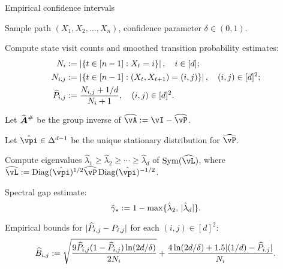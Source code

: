 \begin{algorithm}[t]
\caption{Empirical confidence intervals}
\label{alg:empest}
\begin{algorithmic}[1]
  \renewcommand\algorithmicrequire{\textbf{Input}:}
  \REQUIRE
    Sample path $(X_1,X_2,\dots,X_n)$,
    confidence parameter $\delta \in (0,1)$.

  \STATE Compute state visit counts and smoothed transition
  probability estimates:
  \begin{equation}
    \begin{aligned}
      N_i & :=
      \left|
        \left\{
          t \in [n-1] : X_t = i
        \right\}
      \right|
      , \quad i \in [d] ; \\
      N_{i,j} & :=
      \left|
        \left\{
          t \in [n-1] : (X_t,X_{t+1}) = (i,j)
        \right\}
      \right|
      , \quad (i,j) \in [d]^2 ; \\
      \widehat{P}_{i,j}
      & :=
      \frac{N_{i,j} + 1/d}{N_i + 1}
      , \quad (i,j) \in [d]^2 .
    \end{aligned}
    \notag
  \end{equation}
  \label{step:P}

  \STATE Let $\giAh$ be the group inverse of $\wh\vA := \vI -
  \wh\vP$.
  \label{step:gi}

  \STATE Let $\hat\vpi \in \Delta^{d-1}$ be the unique stationary
  distribution for $\wh\vP$.
  \label{step:pi}

  \STATE Compute eigenvalues $\hat\lambda_1 {\geq} \hat\lambda_2
  {\geq} \dotsb {\geq} \hat\lambda_d$ of $\Sym(\wh\vL)$, where $\wh\vL
  := \Diag(\hat\vpi)^{1/2} \wh\vP \Diag(\hat\vpi)^{-1/2}$.
  \label{step:eig}

  \STATE Spectral gap estimate:
  \[ \hat\gamma_{\star} := 1 - \max\{ \hat\lambda_2,\, |\hat\lambda_d| \} . \]
  \label{step:gap}

  \STATE Empirical bounds for $|\widehat{P}_{i,j}-P_{i,j}|$ for each $(i,j)
  \in [d]^2$:
  \begin{equation}
    \widehat{B}_{i,j}
    :=
    \sqrt{\frac{9\widehat{P}_{i,j}(1-\widehat{P}_{i,j})\ln(2d/\delta)}{2N_i}}
    + \frac{4\ln(2d/\delta)+1.5|(1/d)-\widehat{P}_{i,j}|}{N_i}
    .
    \notag
  \end{equation}
  \label{step:P-bound}



\end{algorithmic}
\end{algorithm}
